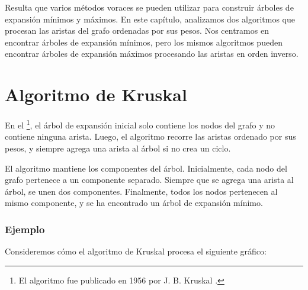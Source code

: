 Resulta que varios métodos voraces
se pueden utilizar para construir árboles de expansión mínimos y máximos.
En este capítulo, analizamos dos algoritmos
que procesan
las aristas del grafo ordenadas por sus pesos.
Nos centramos en encontrar árboles de expansión mínimos,
pero los mismos algoritmos pueden encontrar
árboles de expansión máximos procesando las aristas en orden inverso.

\section{Algoritmo de Kruskal}


En el \footnote{El algoritmo fue publicado en 1956
por J. B. Kruskal \cite{kru56}.}, el árbol de expansión inicial
solo contiene los nodos del grafo
y no contiene ninguna arista.
Luego, el algoritmo recorre las aristas
ordenado por sus pesos, y siempre agrega una arista
al árbol si no crea un ciclo.

El algoritmo mantiene los componentes
del árbol.
Inicialmente, cada nodo del grafo
pertenece a un componente separado.
Siempre que se agrega una arista al árbol,
se unen dos componentes.
Finalmente, todos los nodos pertenecen al mismo componente,
y se ha encontrado un árbol de expansión mínimo.

\subsubsection{Ejemplo}
\begin{samepage}
Consideremos cómo el algoritmo de Kruskal procesa el
siguiente gráfico:
\begin{center}
\end{center}
\end{samepage}

